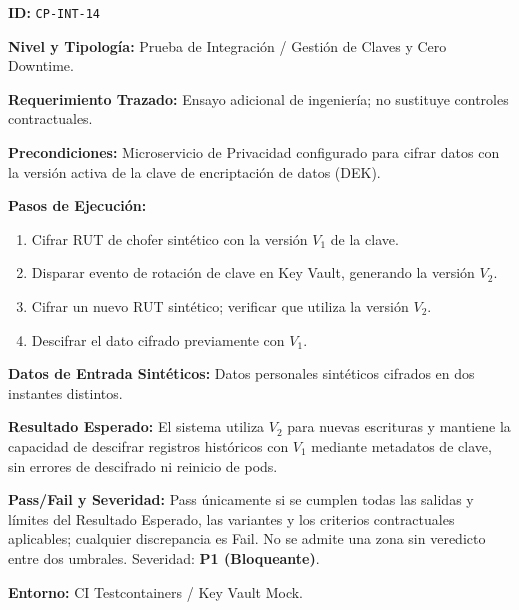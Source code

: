 \par\noindent\textbf{ID:} \texttt{C\allowbreak{}P\allowbreak{}-\allowbreak{}I\allowbreak{}N\allowbreak{}T\allowbreak{}-\allowbreak{}1\allowbreak{}4\allowbreak{}}\par
\par\noindent\textbf{Nivel y Tipología:} Prueba de Integración / Gestión de Claves y Cero Downtime.\par
\par\noindent\textbf{Requerimiento Trazado:} Ensayo adicional de ingeniería; no sustituye controles contractuales.\par
\par\noindent\textbf{Precondiciones:} Microservicio de Privacidad configurado para cifrar datos con la versión activa de la clave de encriptación de datos (DEK).\par
\par\noindent\textbf{Pasos de Ejecución:} \par
\begin{enumerate}
\item Cifrar RUT de chofer sintético con la versión \(V_1\) de la clave.
\item Disparar evento de rotación de clave en Key Vault, generando la versión \(V_2\).
\item Cifrar un nuevo RUT sintético; verificar que utiliza la versión \(V_2\).
\item Descifrar el dato cifrado previamente con \(V_1\).
\end{enumerate}
\par\noindent\textbf{Datos de Entrada Sintéticos:} Datos personales sintéticos cifrados en dos instantes distintos.\par
\par\noindent\textbf{Resultado Esperado:} El sistema utiliza \(V_2\) para nuevas escrituras y mantiene la capacidad de descifrar registros históricos con \(V_1\) mediante metadatos de clave, sin errores de descifrado ni reinicio de pods.\par
\par\noindent\textbf{Pass/Fail y Severidad:} Pass únicamente si se cumplen todas las salidas y límites del Resultado Esperado, las variantes y los criterios contractuales aplicables; cualquier discrepancia es Fail. No se admite una zona sin veredicto entre dos umbrales. Severidad: \textbf{P1 (Bloqueante)}.\par
\par\noindent\textbf{Entorno:} CI Testcontainers / Key Vault Mock.\par







